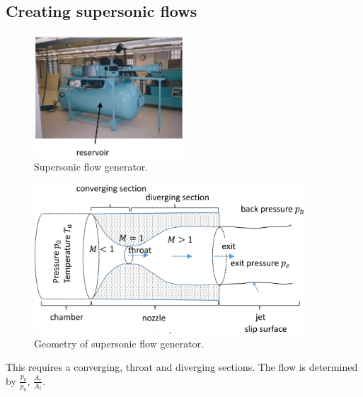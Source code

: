 \documentclass[class=report, crop=false, 12pt,a4paper]{standalone}
\begin{document}
\subsection{Creating supersonic flows}
\begin{figure}[H]
    \centering
    \includegraphics[width = 0.5\textwidth]{../img/diagram53.png}
    \caption{Supersonic flow generator.}
\end{figure}
\begin{figure}[H]
    \centering
    \includegraphics[width = 0.9\textwidth]{../img/diagram54.png}
    \caption{Geometry of supersonic flow generator.}
\end{figure}
This requires a converging, throat and diverging sections. The flow is determined by $\frac{p_b}{p_0}$, $\frac{A_e}{A_t}$.
\end{document}
